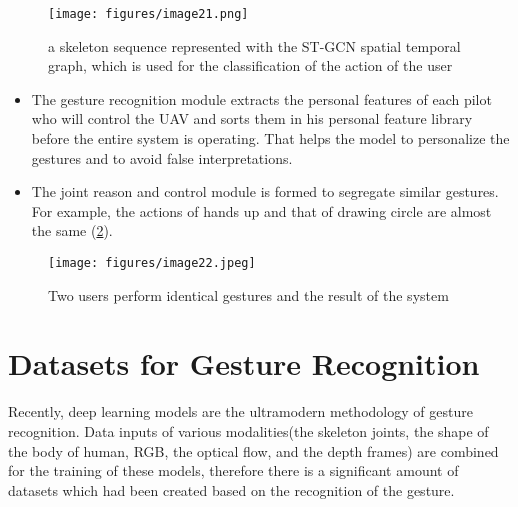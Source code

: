 \documentclass[12pt]{book}
\begin{document}
\begin{figure}[!htbp]
\centering
  \texttt{[image: figures/image21.png]}
  \\
  \caption{a skeleton sequence  represented with the ST-GCN spatial temporal graph, which is used for the classification of the action of the user \cite{HUA2019}}
  \label{fig:fig13}
\end{figure}

\begin{itemize}
    \item The gesture recognition module extracts the personal features of each pilot who will control the UAV and sorts them in his personal feature library before the entire system is operating. That helps the model to personalize the gestures and to avoid false interpretations. 

\item The joint reason and control module is formed to segregate similar gestures. For example, the actions of hands up and that of drawing circle are almost the same (\ref{fig:fig14}). 
\end{itemize}

\begin{figure}[!htbp]
\centering
  \texttt{[image: figures/image22.jpeg]}
  \\
  \caption{Two users perform identical gestures and the result of the system \cite{HUA2019}}
  \label{fig:fig14}
\end{figure}

\chapter{Datasets for Gesture Recognition}
Recently, deep learning models are the ultramodern methodology of gesture recognition. Data inputs of various modalities(the skeleton joints, the shape of the body of human, RGB, the optical flow, and the depth frames) are combined for the training of these models, therefore there is a significant amount of datasets which had been created based on the recognition of the gesture.
\end{document}

